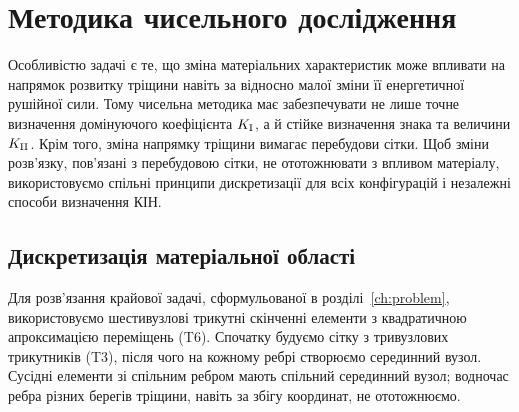 \chapter{Методика чисельного дослідження}
\label{ch:methods}

Особливістю задачі є те, що зміна матеріальних характеристик може впливати на напрямок розвитку тріщини навіть за відносно малої зміни її енергетичної рушійної сили. Тому чисельна методика має забезпечувати не лише точне визначення домінуючого коефіцієнта $K_{\mathrm{I}}$, а й стійке визначення знака та величини $K_{\mathrm{II}}$. Крім того, зміна напрямку тріщини вимагає перебудови сітки. Щоб зміни розв'язку, пов'язані з перебудовою сітки, не ототожнювати з впливом матеріалу, використовуємо спільні принципи дискретизації для всіх конфігурацій і незалежні способи визначення КІН.

\section{Дискретизація матеріальної області}
\label{sec:methods-fem}

Для розв'язання крайової задачі, сформульованої в розділі~\ref{ch:problem}, використовуємо шестивузлові трикутні скінченні елементи з квадратичною апроксимацією переміщень (T6). Спочатку будуємо сітку з тривузлових трикутників (T3), після чого на кожному ребрі створюємо серединний вузол. Сусідні елементи зі спільним ребром мають спільний серединний вузол; водночас ребра різних берегів тріщини, навіть за збігу координат, не ототожнюємо.

